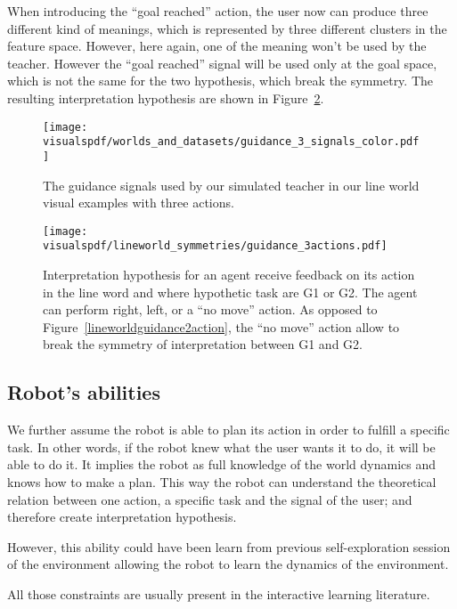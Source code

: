 When introducing the ``goal reached'' action, the user now can produce three different kind of meanings, which is represented by three different clusters in the feature space. However, here again, one of the meaning won't be used by the teacher. However the ``goal reached'' signal will be used only at the goal space, which is not the same for the two hypothesis, which break the symmetry. The resulting interpretation hypothesis are shown in Figure~\ref{fig:lineworldguidance3action}.

\begin{figure}[!htbp]
  \centering
  \texttt{[image: \\visualspdf/worlds\_and\_datasets/guidance\_3\_signals\_color.pdf]}
  \caption{The guidance signals used by our simulated teacher in our line world visual examples with three actions.}
  \label{fig:lineworldguidance3signals}
\end{figure}

\begin{figure}[!htbp]
  \centering
  \texttt{[image: \\visualspdf/lineworld\_symmetries/guidance\_3actions.pdf]}
  \caption{Interpretation hypothesis for an agent receive feedback on its action in the line word and where hypothetic task are G1 or G2. The agent can perform right, left, or a ``no move'' action. As opposed to Figure~\ref{lineworldguidance2action}, the ``no move'' action allow to break the symmetry of interpretation between G1 and G2.}
  \label{fig:lineworldguidance3action}
\end{figure}

\subsection{Robot's abilities}

We further assume the robot is able to plan its action in order to fulfill a specific task. In other words, if the robot knew what the user wants it to do, it will be able to do it. It implies the robot as full knowledge of the world dynamics and knows how to make a plan. This way the robot can understand the theoretical relation between one action, a specific task and the signal of the user; and therefore create interpretation hypothesis.

However, this ability could have been learn from previous self-exploration session of the environment allowing the robot to learn the dynamics of the environment.

\transition

All those constraints are usually present in the interactive learning literature. 

